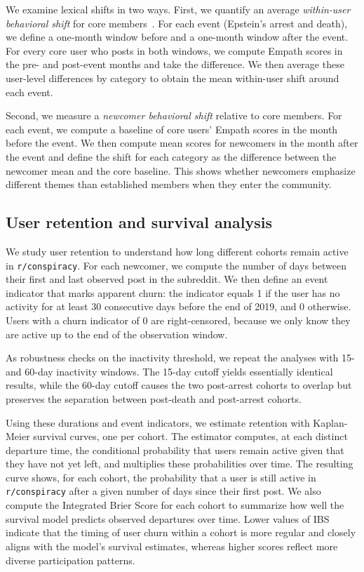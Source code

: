 \documentclass[letterpaper]{article} %
\begin{document}
We examine lexical shifts in two ways. 
First, we quantify an average \emph{within-user behavioral shift} for core members~\citep{balsamo2023pursuit}.
For each event (Epstein's arrest and death), we define a one-month window before and a one-month window after the event. 
For every core user who posts in both windows, we compute Empath scores in the pre- and post-event months and take the difference. 
We then average these user-level differences by category to obtain the mean within-user shift around each event.

Second, we measure a \emph{newcomer behavioral shift} relative to core members.
For each event, we compute a baseline of core users' Empath scores in the month before the event. 
We then compute mean scores for newcomers in the month after the event and define the shift for each category as the difference between the newcomer mean and the core baseline. 
This shows whether newcomers emphasize different themes than established members when they enter the community.

\subsection{User retention and survival analysis}
We study user retention to understand how long different cohorts remain active in \texttt{r/conspiracy}. 
For each newcomer, we compute the number of days between their first and last observed post in the subreddit. 
We then define an event indicator that marks apparent churn: 
the indicator equals 1 if the user has no activity for at least 30 consecutive days before the end of 2019, and 0 otherwise. 
Users with a churn indicator of 0 are right-censored, because we only know they are active up to the end of the observation window.

As robustness checks on the inactivity threshold, we repeat the analyses with 15- and 60-day inactivity windows.
The 15-day cutoff yields essentially identical results, while the 60-day cutoff causes the two post-arrest cohorts to overlap but preserves the separation between post-death and post-arrest cohorts.

Using these durations and event indicators, we estimate retention with Kaplan-Meier survival curves, one per cohort. 
The estimator computes, at each distinct departure time, the conditional probability that users remain active given that they have not yet left, and multiplies these probabilities over time. 
The resulting curve shows, for each cohort, the probability that a user is still active in \texttt{r/conspiracy} after a given number of days since their first post. 
We also compute the Integrated Brier Score for each cohort to summarize how well the survival model predicts observed departures over time. 
Lower values of IBS indicate that the timing of user churn within a cohort is more regular and closely aligns with the model's survival estimates, whereas higher scores reflect more diverse participation patterns.
\end{document}

